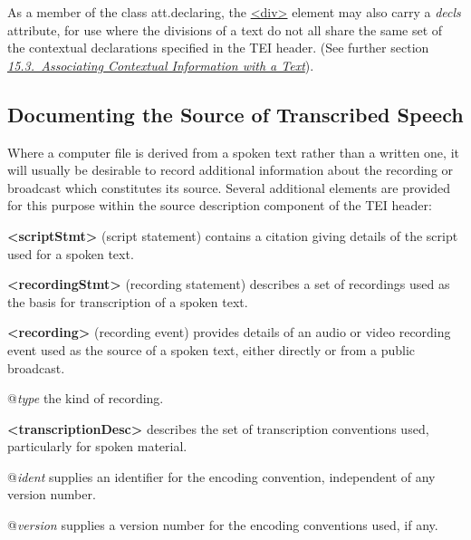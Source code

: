 As a member of the class \textsf{att.declaring}, the \hyperref[TEI.div]{<div>} element may also carry a {\itshape decls} attribute, for use where the divisions of a text do not all share the same set of the contextual declarations specified in the TEI header. (See further section \textit{\hyperref[CCAS]{15.3.\ Associating Contextual Information with a Text}}).
\subsection[{Documenting the Source of Transcribed Speech}]{Documenting the Source of Transcribed Speech}\label{HD32}\par
Where a computer file is derived from a spoken text rather than a written one, it will usually be desirable to record additional information about the recording or broadcast which constitutes its source. Several additional elements are provided for this purpose within the source description component of the TEI header: 
\begin{sansreflist}
  
\item [\textbf{<scriptStmt>}] (script statement) contains a citation giving details of the script used for a spoken text.
\item [\textbf{<recordingStmt>}] (recording statement) describes a set of recordings used as the basis for transcription of a spoken text.
\item [\textbf{<recording>}] (recording event) provides details of an audio or video recording event used as the source of a spoken text, either directly or from a public broadcast.\hfil\\[-10pt]\begin{sansreflist}
    \item[@{\itshape type}]
  the kind of recording.
\end{sansreflist}  
\item [\textbf{<transcriptionDesc>}] describes the set of transcription conventions used, particularly for spoken material.\hfil\\[-10pt]\begin{sansreflist}
    \item[@{\itshape ident}]
  supplies an identifier for the encoding convention, independent of any version number.
    \item[@{\itshape version}]
  supplies a version number for the encoding conventions used, if any.
\end{sansreflist}  
\end{sansreflist}
